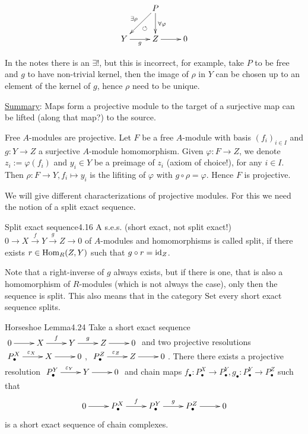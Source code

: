 \documentclass[twoside = false,	%
		headsepline,		%
		parskip = true,
		]{scrbook}						%
\begin{document}
    \begin{equation*}
    \xymatrix {
        & P \ar[d]^{\forall \varphi} \ar[dl]_{\exists \rho}^{\circlearrowleft} \\
        Y \ar[r]_g & Z \ar[r] & 0
    }
    \end{equation*}

    In the notes there is an $\exists!$, but this is incorrect, for example, take $P$ to be free and $g$ to have non-trivial kernel, then the image of $\rho$ in $Y$ can be chosen up to an element of the kernel of $g$, hence $\rho$ need to be unique.

    \underline{Summary}: Maps form a projective module to the target of a surjective map can be lifted (along that map?) to the source.

    \begin{example}{}{}
        Free $A$-modules are projective. Let $F$ be a free $A$-module with basis $(f_i)_{i \in I}$ and $g: Y \to Z$ a surjective $A$-module homomorphism. Given $\varphi: F \to Z$, we denote $z_i:= \varphi(f_i)$ and $y_i \in Y$ be a preimage of $z_i$ (axiom of choice!), for any $i \in I$. Then $\rho: F \to Y, f_i \mapsto y_i$ is the lifiting of $\varphi$ with $g \circ \rho = \varphi$. Hence $F$ is projective.
    \end{example}

    We will give different characterizations of projective modules. For this we need the notion of a split exact sequence.

    \begin{definition}{Split exact sequence}{4.16}
        A s.e.s. (short exact, not split exact!) $0 \to X \xrightarrow{f} Y \xrightarrow{g} Z \to 0$ of $A$-modules and homomorphisms is called split, if there exists $r \in \mathrm{Hom}_R(Z,Y)$ such that $g \circ r = \mathrm{id}_Z$.
    \end{definition}

    Note that a right-inverse of $g$ always exists, but if there is one, that is also a homomorphism of $R$-modules (which is not always the case), only then the sequence is split. This also means that in the category $\mathrm{Set}$ every short exact sequence splits.
    
    \begin{lemma}{Horseshoe Lemma}{4.24}
        Take a short exact sequence $\xymatrix{0 \ar[r]& X\ar[r]^{f} & Y\ar[r]^g & Z\ar[r] & 0}$ and two projective resolutions $\xymatrix {P_\bullet^X \ar[r]^{\e_X} & X \ar[r] & 0}$, $\xymatrix {P_\bullet^Z \ar[r]^{\e_Z} & Z \ar[r] & 0}$. There there exists a projective resolution $\xymatrix {P_\bullet^Y \ar[r]^{\e_Y} & Y \ar[r] & 0}$ and chain maps $f_\bullet:P_\bullet^X \to P_\bullet^Y, g_\bullet: P_\bullet^Y \to P_\bullet^Z$ such that
        \begin{equation*}
        \xymatrix {
            0 \ar[r]& P_\bullet^X \ar[r]^f & \ar[r]^g P_\bullet^Y & P_\bullet^Z \ar[r] & 0 
        }
        \end{equation*} is a short exact sequence of chain complexes.
    \end{lemma}
\end{document}
